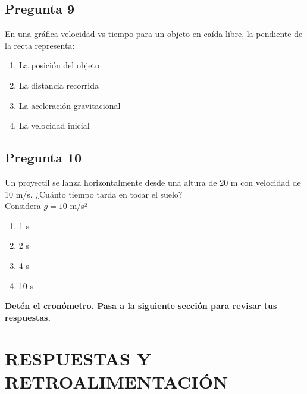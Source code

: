 \begin{preguntabox}
\subsection{Pregunta 9}
En una gráfica velocidad vs tiempo para un objeto en caída libre, la pendiente de la recta representa:

\begin{enumerate}
    \item[A)] La posición del objeto
    \item[B)] La distancia recorrida
    \item[C)] La aceleración gravitacional
    \item[D)] La velocidad inicial
\end{enumerate}
\end{preguntabox}

\begin{preguntabox}
\subsection{Pregunta 10}
Un proyectil se lanza horizontalmente desde una altura de 20 m con velocidad de 10 m/s. ¿Cuánto tiempo tarda en tocar el suelo?\\
Considera $g = 10$ m/s²

\begin{enumerate}
    \item[A)] 1 s
    \item[B)] 2 s
    \item[C)] 4 s
    \item[D)] 10 s
\end{enumerate}
\end{preguntabox}

\vspace{1cm}

\begin{tcolorbox}[colback=amarillonotа, colframe=orange, boxrule=0pt, leftrule=3pt]
\textbf{Detén el cronómetro. Pasa a la siguiente sección para revisar tus respuestas.}
\end{tcolorbox}

\newpage
\onecolumn
\section{RESPUESTAS Y RETROALIMENTACIÓN}

